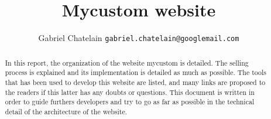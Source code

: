 \documentclass[letterpaper, 10 pt, conference]{ieeeconf}  %
\title{\LARGE \bf
Mycustom website
}
\author{\parbox{3 in}{\centering Gabriel Chatelain {\tt\small gabriel.chatelain@googlemail.com}}}
\begin{document}
\maketitle
\thispagestyle{empty}
\pagestyle{empty}


\begin{abstract}

In this report, the organization of the website mycustom is detailed. The selling process is explained and its implementation is detailed as much as possible. The tools that has been used to develop this website are listed, and many links are proposed to the readers if this latter has any doubts or questions. This document is written in order to guide furthers developers and try to go as far as possible in the technical detail of the architecture of the website. 

\end{abstract}










\end{document}
